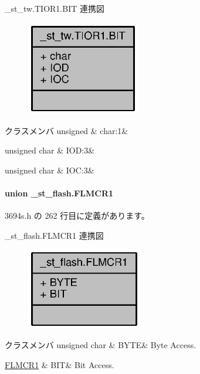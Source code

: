 \+\_\+st\+\_\+tw.\+T\+I\+O\+R1.\+B\+I\+T 連携図
\nopagebreak
\begin{figure}[H]
\begin{center}
\leavevmode
\includegraphics[width=140pt]{d0/d4d/struct__st__tw_8TIOR1_8BIT__coll__graph}
\end{center}
\end{figure}
\begin{DoxyFields}{クラスメンバ}
unsigned\label{3694s_8h_aa87deb01c5f539e6bda34829c8ef2368}
&
char\+:1&
\\
\hline

unsigned char\label{3694s_8h_a5c3e21467b0d014464a545616a072bd0}
&
I\+O\+D\+:3&
\\
\hline

unsigned char\label{3694s_8h_a7245a636843f38ae56d5862d502a4303}
&
I\+O\+C\+:3&
\\
\hline

\end{DoxyFields}
\label{union__st__flash_8FLMCR1}
\paragraph{union \+\_\+st\+\_\+flash.\+F\+L\+M\+C\+R1}


 3694s.\+h の 262 行目に定義があります。



\+\_\+st\+\_\+flash.\+F\+L\+M\+C\+R1 連携図
\nopagebreak
\begin{figure}[H]
\begin{center}
\leavevmode
\includegraphics[width=143pt]{d8/df8/union__st__flash_8FLMCR1__coll__graph}
\end{center}
\end{figure}
\begin{DoxyFields}{クラスメンバ}
unsigned char\label{3694s_8h_ae409eb2ba6eb6801f52763ae370c350e}
&
B\+Y\+T\+E&
Byte Access. \\
\hline

\hyperlink{3694s_8h_dd/d09/struct__st__flash_8FLMCR1_8BIT}{F\+L\+M\+C\+R1}\label{3694s_8h_adb957fdc8000e1eef04a243f5199aa52}
&
B\+I\+T&
Bit Access. \\
\hline

\end{DoxyFields}
\label{struct__st__flash_8FLMCR1_8BIT}
